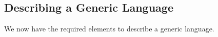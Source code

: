 \begin{code}%
\>[0]\AgdaSpace{}%
\AgdaSymbol{:}\AgdaSpace{}%
\AgdaSpace{}%
\AgdaSpace{}%
\AgdaSpace{}%
\AgdaSymbol{(}\AgdaSpace{}%
\AgdaSpace{}%
\AgdaSpace{}%
\AgdaSpace{}%
\AgdaSpace{}%
\AgdaSymbol{)}\AgdaSpace{}%
\AgdaSpace{}%
\AgdaSpace{}%
\AgdaSpace{}%
\AgdaSpace{}%
\<%
\\
\>[0]\AgdaSpace{}%
\AgdaSpace{}%
\AgdaSpace{}%
\AgdaSpace{}%
%
\>[16]\AgdaSpace{}%
%
\>[21]\AgdaSymbol{=}\AgdaSpace{}%
\AgdaFunction{Σ[}\AgdaSpace{}%
\AgdaSpace{}%
\AgdaSpace{}%
\AgdaSpace{}%
\AgdaFunction{]}\AgdaSpace{}%
\AgdaSpace{}%
\AgdaSpace{}%
\AgdaSpace{}%
\AgdaSpace{}%
\AgdaSpace{}%
\<%
\\
\>[0]\AgdaSpace{}%
\AgdaSpace{}%
\AgdaSpace{}%
\AgdaSpace{}%
%
\>[16]\AgdaSpace{}%
%
\>[21]\AgdaSymbol{=}\AgdaSpace{}%
\AgdaSpace{}%
\AgdaSpace{}%
\AgdaSpace{}%
\AgdaSpace{}%
\AgdaSymbol{(}\AgdaSpace{}%
\AgdaOperator{\AgdaInductiveConstructor{-,}}\AgdaSpace{}%
\AgdaSymbol{)}\<%
\\
\>[0]\AgdaSpace{}%
\AgdaSpace{}%
\AgdaSpace{}%
%
\>[16]\AgdaSpace{}%
%
\>[21]\AgdaSymbol{=}\AgdaSpace{}%
\AgdaSpace{}%
\AgdaSpace{}%
\<%
\\
\>[0]\AgdaSpace{}%
\AgdaSpace{}%
\AgdaSpace{}%
\AgdaSpace{}%
%
\>[16]\AgdaSpace{}%
%
\>[21]\AgdaSymbol{=}\AgdaSpace{}%
\AgdaSpace{}%
\AgdaSpace{}%
\AgdaSpace{}%
\AgdaSpace{}%
\AgdaSpace{}%
\AgdaSpace{}%
\AgdaSpace{}%
\AgdaSpace{}%
\AgdaSpace{}%
\AgdaSpace{}%
\<%
\\
\>[0]\AgdaSpace{}%
\AgdaSpace{}%
%
\>[16]\AgdaSpace{}%
%
\>[21]\AgdaSymbol{=}\AgdaSpace{}%
\<%
\end{code}

\subsection{Describing a Generic Language}

We now have the required elements to describe a generic language.

